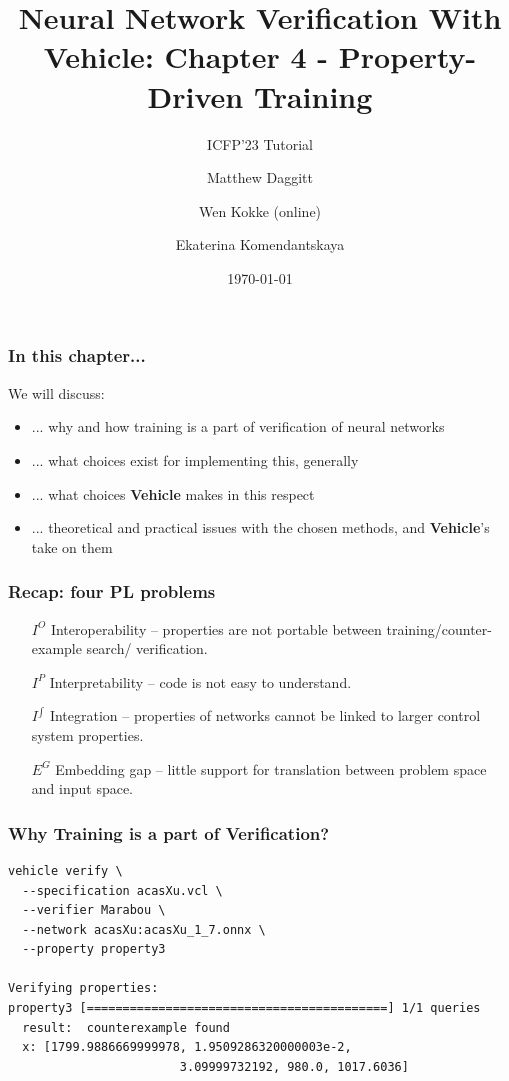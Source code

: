 \documentclass[t,compress,aspectratio=169]{beamer}
\title{Neural Network Verification With Vehicle: Chapter 4 -  Property-Driven Training}
\subtitle{ICFP'23 Tutorial}  %
\date{\today}
\author{Matthew Daggitt  \inst{1} \and Wen Kokke (online) \inst{2}  \and Ekaterina Komendantskaya\inst{3}}
\institute{$^{1}$Heriot-Watt University $\cdot$ $^{2}$University of Strathclyde $\cdot$  $^{3}$University of Southampton }
\begin{document}

\setbackground
\begin{frame} %
  \titlepage
\end{frame}
\unsetbackground


\begin{frame}
\frametitle{In this chapter...}

We will discuss:

\begin{itemize}[<+->]
\item  ...  why and how training is a part of verification of neural networks
\item ... what choices exist for implementing this, generally
\item ... what choices \textbf{Vehicle} makes in this respect
\item ... theoretical and practical issues with the chosen methods, and \textbf{Vehicle}'s
take on them
\end{itemize}

\end{frame}


\begin{frame}
\frametitle{Recap: four PL problems}

\begin{itemize}
\item[$I^O$] \alert{Interoperability -- properties are not portable between training/counter-example search/ verification.}

\item[$I^{P}$] Interpretability -- code is not easy to understand.

\item[$I^{\int}$] Integration -- properties of networks cannot be linked to larger control system properties.

\item[$E^G$] Embedding gap -- little support for translation between problem space and input space.
\end{itemize}
\end{frame}


    \begin{frame}[fragile]
\frametitle{Why Training is a part of Verification?}

\begin{verbatim}
vehicle verify \
  --specification acasXu.vcl \
  --verifier Marabou \
  --network acasXu:acasXu_1_7.onnx \
  --property property3

Verifying properties:
property3 [==========================================] 1/1 queries
  result:  counterexample found
  x: [1799.9886669999978, 1.9509286320000003e-2,
                        3.09999732192, 980.0, 1017.6036]
\end{verbatim}

\end{frame}
\end{document}
